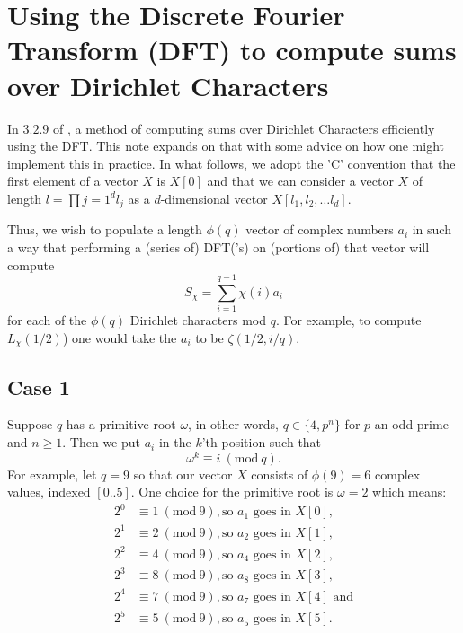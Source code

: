 \documentclass[12pt]{amsart}
\newcommand{\Mod}[1]{\ (\mathrm{mod}\ #1)}
\theoremstyle{remark}
\numberwithin{theorem}{section}
\numberwithin{equation}{section}
\begin{document}
\section{Using the Discrete Fourier Transform (DFT) to compute sums over Dirichlet Characters}

In $3.2.9$ of \cite{Platt2011}, a method of computing sums over Dirichlet Characters efficiently using the DFT. This note expands on that with some advice on how one might implement this in practice. In what follows, we adopt the 'C' convention that the first element of a vector $X$ is $X[0]$ and that we can consider a vector $X$ of length $l=\prod\limits{j=1}^d l_j$ as a $d$-dimensional vector $X[l_1,l_2,\ldots l_d]$.

Thus, we wish to populate a length $\phi(q)$ vector of complex numbers $a_i$ in such a way that performing a (series of) DFT('s) on (portions of) that vector will compute
$$
S_\chi=\sum\limits_{i=1}^{q-1} \chi(i) a_i
$$
for each of the $\phi(q)$ Dirichlet characters mod $q$. For example, to compute $L_\chi(1/2)$) one would take the $a_i$ to be $\zeta(1/2,i/q)$.

\subsection{Case 1}

Suppose $q$ has a primitive root $\omega$, in other words, $q\in\{4,p^n\}$ for $p$ an odd prime and $n\geq 1$. Then we put $a_i$ in the $k$'th position such that
$$
\omega^k \equiv i \Mod{q}.
$$
For example, let $q=9$ so that our vector $X$ consists of $\phi(9)=6$ complex values, indexed $[0..5]$. One choice for the primitive root is $\omega=2$ which means:
\begin{equation*}
  \begin{split}
    2^0 &\equiv 1\Mod{9}, \textrm{so }a_1\textrm{ goes in } X[0],\\
    2^1 &\equiv 2\Mod{9}, \textrm{so }a_2\textrm{ goes in } X[1],\\
    2^2 &\equiv 4\Mod{9}, \textrm{so }a_4\textrm{ goes in } X[2],\\
    2^3 &\equiv 8\Mod{9}, \textrm{so }a_8\textrm{ goes in } X[3],\\
    2^4 &\equiv 7\Mod{9}, \textrm{so }a_7\textrm{ goes in } X[4] \textrm{ and}\\
    2^5 &\equiv 5\Mod{9}, \textrm{so } a_5\textrm{ goes in } X[5].
  \end{split}
\end{equation*}
\end{document}
